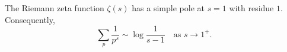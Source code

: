 The Riemann zeta function $\zeta(s)$ has a simple pole at $s=1$ with residue $1$. Consequently,
$$
\sum_p \frac{1}{p^s} \sim \log\frac{1}{s-1} \quad \text{as } s \to 1^+.
$$
